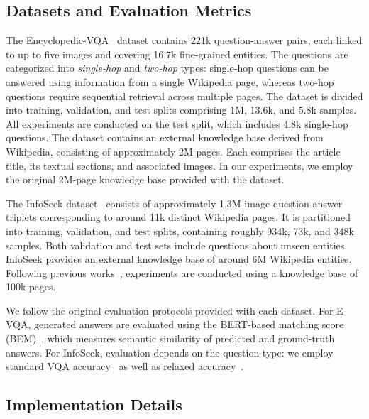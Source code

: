 \subsection{Datasets and Evaluation Metrics}

The Encyclopedic-VQA~\cite{mensink2023encyclopedic}
dataset contains 221k question-answer pairs, each linked to up to five images and covering 16.7k fine-grained entities.  
The questions are categorized into \textit{single-hop} and \textit{two-hop} types: single-hop questions can be answered using information from a single Wikipedia page, whereas two-hop questions require sequential retrieval across multiple pages. The dataset is divided into training, validation, and test splits comprising 1M, 13.6k, and 5.8k samples. All experiments are conducted on the test split, which includes 4.8k single-hop questions. The dataset contains an external knowledge base derived from Wikipedia, consisting of approximately 2M pages. Each comprises the article title, its textual sections, and associated images. In our experiments, we employ the original 2M-page knowledge base provided with the dataset.

 The InfoSeek dataset~\cite{chen2023can} consists of approximately 1.3M image-question-answer triplets corresponding to around 11k distinct Wikipedia pages. It is partitioned into training, validation, and test splits, containing roughly 934k, 73k, and 348k samples. Both validation and test sets include questions about unseen entities.
InfoSeek provides an external knowledge base of around 6M Wikipedia entities. Following previous works~\cite{caffagni2024wiki,cocchi2025augmenting,yan2024echosight}, experiments are conducted using a knowledge base of 100k pages.

We follow the original evaluation protocols provided with each dataset. For E-VQA, generated answers are evaluated using the BERT-based matching score (BEM)~\cite{bulian2022tomayto}, which measures semantic similarity of predicted and ground-truth answers. For InfoSeek, evaluation depends on the question type: we employ standard VQA accuracy~\cite{goyal2017making} as well as relaxed accuracy~\cite{methani2020plotqa}.


\subsection{Implementation Details}
\label{subsec:details}

